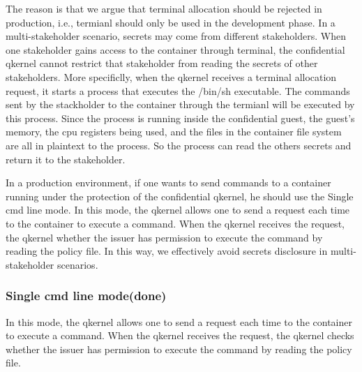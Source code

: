 The reason is that we argue that terminal allocation should be rejected in production, i.e., termianl should only be used in the development phase. In a multi-stakeholder scenario, secrets may come from different stakeholders. When one stakeholder 
gains access to the container through terminal, the confidential qkernel cannot restrict that stakeholder from reading the secrets of other stakeholders. More specificlly, when the qkernel receives a terminal allocation request, it starts a process 
that executes the /bin/sh executable. The commands sent by the stackholder to the container through the termianl will be executed by this process. Since the process is running inside the confidential guest, the guest's memory, the cpu registers being 
used, and the files in the container file system are all in plaintext to the process. So the process can read the others secrets and return it to the stakeholder.

In a production environment, if one wants to send commands to a container running under the protection of the confidential qkernel, he should use the Single cmd line mode. In this mode, the qkernel allows one to send a request each time to the container to execute a command. 
When the qkernel receives the request, the qkernel whether the issuer has permission to execute the command by reading the policy file. In this way, we effectively avoid secrets disclosure in multi-stakeholder
scenarios.

\subsubsection{Single cmd line mode(done)}
In this mode, the qkernel allows one to send a request each time to the container to execute a command. 
When the qkernel receives the request, the qkernel checks whether the issuer has permission to execute the command by reading the policy file.

